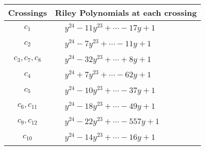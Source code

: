 \documentclass[1p]{elsarticle_modified}
\theoremstyle{definition}
\begin{document}
\begin{tabular}{m{50pt}|m{274pt}}
Crossings & \hspace{64pt}Riley Polynomials at each crossing \\
\hline $$\begin{aligned}c_{1}\end{aligned}$$&$\begin{aligned}
&y^{24}-11 y^{23}+\cdots-17 y+1
\end{aligned}$\\
\hline $$\begin{aligned}c_{2}\end{aligned}$$&$\begin{aligned}
&y^{24}-7 y^{23}+\cdots-11 y+1
\end{aligned}$\\
\hline $$\begin{aligned}c_{3},c_{7},c_{8}\end{aligned}$$&$\begin{aligned}
&y^{24}-32 y^{23}+\cdots+8 y+1
\end{aligned}$\\
\hline $$\begin{aligned}c_{4}\end{aligned}$$&$\begin{aligned}
&y^{24}+7 y^{23}+\cdots-62 y+1
\end{aligned}$\\
\hline $$\begin{aligned}c_{5}\end{aligned}$$&$\begin{aligned}
&y^{24}-10 y^{23}+\cdots-37 y+1
\end{aligned}$\\
\hline $$\begin{aligned}c_{6},c_{11}\end{aligned}$$&$\begin{aligned}
&y^{24}-18 y^{23}+\cdots-49 y+1
\end{aligned}$\\
\hline $$\begin{aligned}c_{9},c_{12}\end{aligned}$$&$\begin{aligned}
&y^{24}-22 y^{23}+\cdots-557 y+1
\end{aligned}$\\
\hline $$\begin{aligned}c_{10}\end{aligned}$$&$\begin{aligned}
&y^{24}-14 y^{23}+\cdots-16 y+1
\end{aligned}$\\
\hline
\end{tabular}\\~\\
\end{document}

